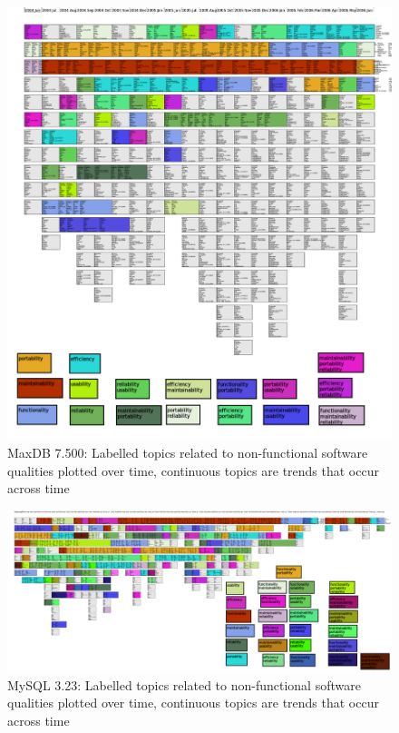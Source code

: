 \documentclass{acm_proc_article-sp}
\begin{document}
\begin{figure}
  \centering
  \includegraphics[height=.9\textheight]{small-maxdb-time-smear-plot-Equal}
  \caption{MaxDB 7.500: Labelled topics related to non-functional software qualities plotted over time, continuous topics are trends that occur across time}
  \label{fig:maxdb}
\end{figure}

\begin{figure}[h]
  \centering
  \includegraphics[width=.99\textwidth]{small-mysql-time-smear-plot-Equal}
  \caption{MySQL 3.23: Labelled topics related to non-functional software qualities plotted over time, continuous topics are trends that occur across time}
  \label{fig:mysql}
\end{figure}
\end{document}
